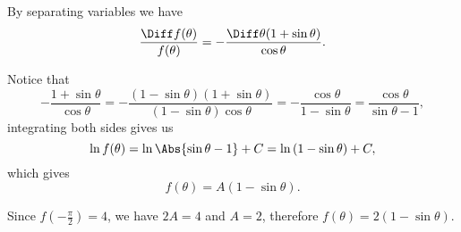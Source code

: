 By separating variables we have
\[
    \frac{\Diff f(\theta)}{f(\theta)} = - \frac{\Diff \theta (1 + \sin \theta)}{\cos \theta}.
\]

Notice that
\[
    -\frac{1 + \sin \theta}{\cos \theta} = - \frac{(1 - \sin \theta) (1 + \sin \theta)}{(1 - \sin \theta) \cos \theta} = - \frac{\cos \theta}{1 - \sin \theta} = \frac{\cos \theta}{\sin \theta - 1},
\]
integrating both sides gives us
\[
    \ln f(\theta) = \ln \Abs{\sin \theta - 1} + C = \ln \left(1 - \sin \theta\right) + C,
\]
which gives
\[
    f(\theta) = A (1 - \sin \theta).
\]

Since \(f\left(-\frac{\pi}{2}\right) = 4\), we have \(2A = 4\) and \(A = 2\), therefore \(f(\theta) = 2 (1 - \sin \theta)\).

\begin{center}
    
\end{center}